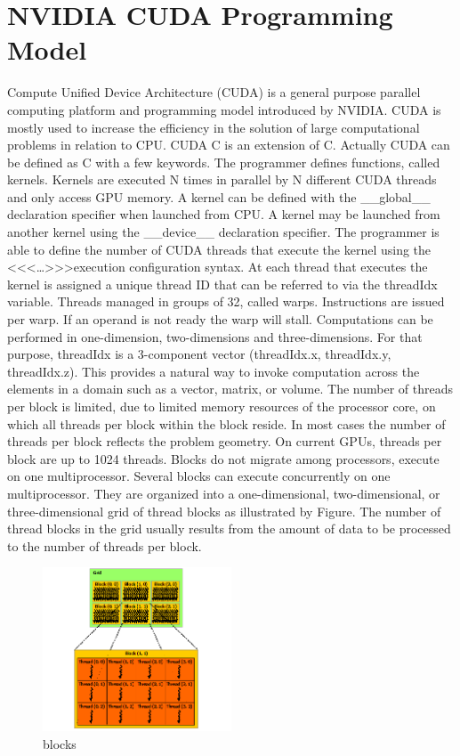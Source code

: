 \section{NVIDIA CUDA Programming Model}
Compute Unified Device Architecture (CUDA) is a general purpose parallel computing platform and programming model introduced by NVIDIA. CUDA is mostly used to increase the efficiency in the solution of large computational problems in relation to CPU.
CUDA C is an extension of C. Actually CUDA can be defined as C with a few keywords. The programmer defines functions, called kernels. Kernels are executed N times in parallel by N different CUDA threads and only access GPU memory. A kernel can be defined with the \_\_global\_\_ declaration specifier when launched from CPU. A kernel may be launched from another kernel using the \_\_device\_\_ declaration specifier. The programmer is able to define the number of CUDA threads that execute the kernel using the <<<…>>>execution configuration syntax. At each thread that executes the kernel is assigned a unique thread ID that can be referred to via the threadIdx variable. Threads managed in groups of 32, called warps. Instructions are issued per warp. If an operand is not ready the warp will stall. Computations can be performed in one-dimension, two-dimensions and three-dimensions. For that purpose, threadIdx is a 3-component vector (threadIdx.x, threadIdx.y, threadIdx.z). This provides a natural way to invoke computation across the elements in a domain such as a vector, matrix, or volume. The number of threads per block is limited, due to limited memory resources of the processor core, on which all threads per block within the block reside. In most cases the number of threads per block reflects the problem geometry. On current GPUs, threads per block are up to 1024 threads. Blocks do not migrate among processors, execute on one multiprocessor. Several blocks can execute concurrently on one multiprocessor. They are organized into a one-dimensional, two-dimensional, or three-dimensional grid of thread blocks as illustrated by Figure. The number of thread blocks in the grid usually results from the amount of data to be processed to the number of threads per block. 

\begin{figure}[h]
   \centering
       \includegraphics[width=0.5\textwidth]{blocks}
   \caption{blocks}
   \label{fig:blocks}
\end{figure}

